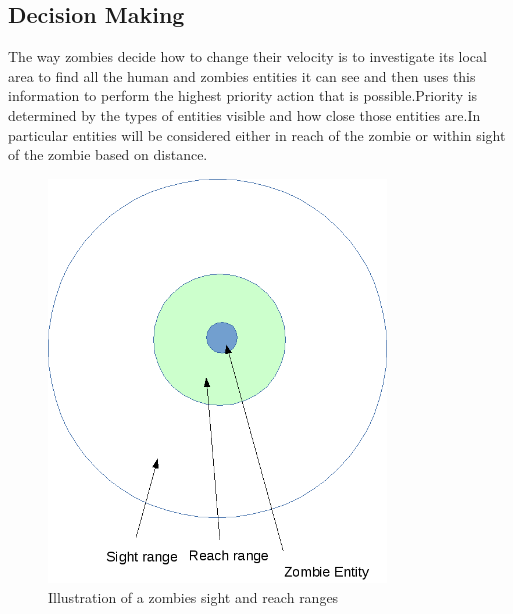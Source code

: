 \subsection{Decision Making}
The way zombies decide how to change their velocity is to investigate its local area to find all the human and zombies entities it can see and then uses this information to perform the highest priority action that is possible.Priority is determined by the types of entities visible and how close those entities are.In particular entities will be considered either in reach of the zombie or within sight of the zombie based on distance.
\begin{figure}[h]
  \centering
  \includegraphics[width=0.8\textwidth]{img/zombie_range.png}
\caption{Illustration of a zombies sight and reach ranges}
    \label{fig:Illustration of a zombies sight and reach ranges}
\end{figure}
